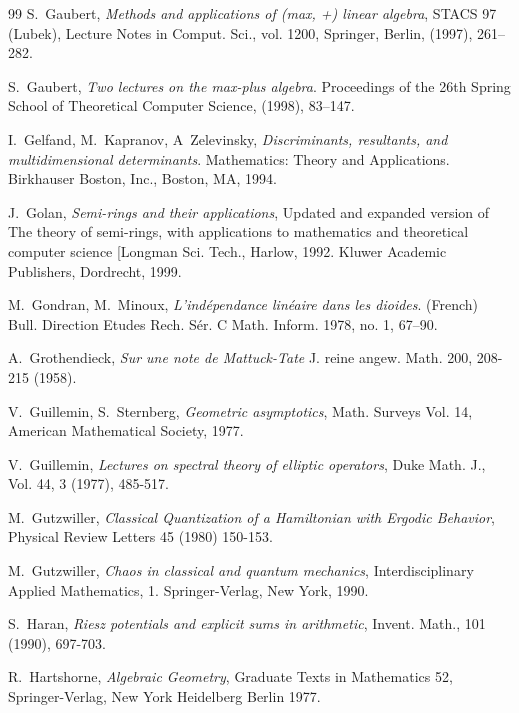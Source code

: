 \documentclass[12pt]{article}
\begin{document}
\begin{thebibliography}{99}
 S.~Gaubert,  {\em Methods and applications of (max, +) linear algebra}, STACS 97 (Lubek), Lecture Notes
in Comput. Sci., vol. 1200, Springer, Berlin, (1997),  261--282.


 S.~Gaubert, {\em Two lectures on the max-plus algebra}.
 Proceedings of the 26th Spring School of Theoretical Computer Science,  (1998), 83--147.

 I.~Gelfand, M.~Kapranov, A~Zelevinsky, {\em Discriminants, resultants, and multidimensional determinants}.
 Mathematics: Theory and Applications. Birkhauser Boston, Inc., Boston, MA, 1994.

 J.~Golan, {\em Semi-rings and their applications}, Updated and expanded version of The theory of semi-rings, with applications to mathematics and theoretical computer science [Longman Sci. Tech., Harlow, 1992. Kluwer Academic Publishers, Dordrecht, 1999.

 M.~Gondran, M.~Minoux, {\em L'ind\' ependance lin\' eaire dans les dioides}. (French) Bull. Direction Etudes Rech. S\' er. C Math. Inform. 1978, no. 1, 67--90.


 A.~Grothendieck, {\em Sur une note de Mattuck-Tate} J. reine angew. Math. 200, 208-215 (1958).






 V.~Guillemin, S.~Sternberg, {\em Geometric asymptotics},
Math. Surveys Vol. 14, American Mathematical Society, 1977.

  V.~Guillemin,  {\em Lectures on spectral theory of
elliptic operators},   Duke Math. J.,  Vol. 44, 3 (1977), 485-517.

 M.~Gutzwiller, {\em Classical Quantization of a Hamiltonian with Ergodic Behavior},
Physical Review Letters 45 (1980) 150-153.

 M.~Gutzwiller, {\em Chaos in classical and quantum mechanics}, Interdisciplinary Applied Mathematics, 1. Springer-Verlag, New York, 1990.

\bibitem{[H]} S.~Haran, {\em Riesz potentials and explicit sums in
arithmetic},  Invent. Math.,  101 (1990), 697-703.

 R.~Hartshorne,  {\em Algebraic Geometry}, Graduate Texts in Mathematics 52, Springer-Verlag, New York Heidelberg Berlin 1977.


\end{thebibliography}
\end{document}
